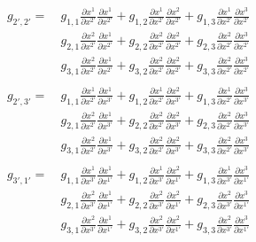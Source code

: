 \documentclass[a4paper]{article}
\begin{document}
  \]
  \[
    \begin{align*}
    g_{2', 2'} =
     &\ g_{1,1}\frac{\partial x^1}{\partial x^{2'}}\frac{\partial x^1}{\partial x^{2'}}
    +g_{1,2}\frac{\partial x^1}{\partial x^{2'}}\frac{\partial x^2}{\partial x^{2'}}
    +g_{1,3}\frac{\partial x^1}{\partial x^{2'}}\frac{\partial x^3}{\partial x^{2'}}\\
    &\
     g_{2,1}\frac{\partial x^2}{\partial x^{2'}}\frac{\partial x^1}{\partial x^{2'}}
    +g_{2,2}\frac{\partial x^2}{\partial x^{2'}}\frac{\partial x^2}{\partial x^{2'}}
    +g_{2,3}\frac{\partial x^2}{\partial x^{2'}}\frac{\partial x^3}{\partial x^{2'}}\\
    &\
     g_{3,1}\frac{\partial x^2}{\partial x^{2'}}\frac{\partial x^1}{\partial x^{2'}}
    +g_{3,2}\frac{\partial x^2}{\partial x^{2'}}\frac{\partial x^2}{\partial x^{2'}}
    +g_{3,3}\frac{\partial x^2}{\partial x^{2'}}\frac{\partial x^3}{\partial x^{2'}}\\
    \end{align*}
  \]
  \[
    \begin{align*}
    g_{2', 3'} =
     &\ g_{1,1}\frac{\partial x^1}{\partial x^{2'}}\frac{\partial x^1}{\partial x^{3'}}
    +g_{1,2}\frac{\partial x^1}{\partial x^{2'}}\frac{\partial x^2}{\partial x^{3'}}
    +g_{1,3}\frac{\partial x^1}{\partial x^{2'}}\frac{\partial x^3}{\partial x^{3'}}\\
    &\
     g_{2,1}\frac{\partial x^2}{\partial x^{2'}}\frac{\partial x^1}{\partial x^{3'}}
    +g_{2,2}\frac{\partial x^2}{\partial x^{2'}}\frac{\partial x^2}{\partial x^{3'}}
    +g_{2,3}\frac{\partial x^2}{\partial x^{2'}}\frac{\partial x^3}{\partial x^{3'}}\\
    &\
     g_{3,1}\frac{\partial x^2}{\partial x^{2'}}\frac{\partial x^1}{\partial x^{3'}}
    +g_{3,2}\frac{\partial x^2}{\partial x^{2'}}\frac{\partial x^2}{\partial x^{3'}}
    +g_{3,3}\frac{\partial x^2}{\partial x^{2'}}\frac{\partial x^3}{\partial x^{3'}}\\
    \end{align*}
  \]
  \[
    \begin{align*}
    g_{3', 1'} =\
     &g_{1,1}\frac{\partial x^1}{\partial x^{3'}}\frac{\partial x^1}{\partial x^{1'}}
    +g_{1,2}\frac{\partial x^1}{\partial x^{3'}}\frac{\partial x^2}{\partial x^{1'}}
    +g_{1,3}\frac{\partial x^1}{\partial x^{3'}}\frac{\partial x^3}{\partial x^{1'}}\\
    &
     g_{2,1}\frac{\partial x^2}{\partial x^{3'}}\frac{\partial x^1}{\partial x^{1'}}
    +g_{2,2}\frac{\partial x^2}{\partial x^{3'}}\frac{\partial x^2}{\partial x^{1'}}
    +g_{2,3}\frac{\partial x^2}{\partial x^{3'}}\frac{\partial x^3}{\partial x^{1'}}\\
    &
     g_{3,1}\frac{\partial x^2}{\partial x^{3'}}\frac{\partial x^1}{\partial x^{1'}}
    +g_{3,2}\frac{\partial x^2}{\partial x^{3'}}\frac{\partial x^2}{\partial x^{1'}}
    +g_{3,3}\frac{\partial x^2}{\partial x^{3'}}\frac{\partial x^3}{\partial x^{1'}}\\
    \end{align*}
  \]
\end{document}
